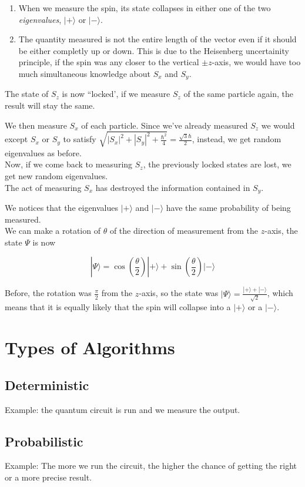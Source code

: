 \documentclass{article}
\begin{document}
\begin{enumerate}
    \item When we measure the spin, its state collapses in either one of the two \textit{eigenvalues}, \(|+\rangle\) or \(|-\rangle\).
    \item The quantity measured is not the entire length of the vector even if it should be either completly up or down.
        This is due to the Heisenberg uncertainity principle, if the spin was any closer to the vertical \(\pm z\)-axis,
        we would have too much simultaneous knowledge about \(S_x\) and \(S_y\).
\end{enumerate}

The state of \(S_z\) is now ``locked', if we measure \(S_z\) of the same particle again, the result will stay the same.

We then measure \(S_x\) of each particle. Since we've already measured \(S_z\) we would except \(S_x\) or \(S_y\)
to satisfy \(\sqrt{{|S_x|}^2 + {|S_y|}^2 + \frac{\hbar^2}{4}} = \frac{\sqrt{3}\hbar}{2}\), instead, we get random eigenvalues as before. \\
Now, if we come back to measuring \(S_z\), the previously locked states are lost, we get new random eigenvalues. \\
The act of measuring \(S_x\) has destroyed the information contained in \(S_y\).

We notices that the eigenvalues \(|+\rangle\) and \(|-\rangle\) have the same probability of being measured. \\
We can make a rotation of \(\theta\) of the direction of measurement from the \(z\)-axis, the state \(\Psi\) is now

\[
    |\Psi\rangle = \cos\left(\frac{\theta}{2}\right) |+\rangle + \sin\left(\frac{\theta}{2}\right)|-\rangle
\]

Before, the rotation was \(\frac{\pi}{2}\) from the \(z\)-axis, so the state was \(|\Psi\rangle=\frac{|+\rangle + |-\rangle}{\sqrt{2}}\),
which means that it is equally likely that the spin will collapse into a \(|+\rangle\) or a \(|-\rangle\).

\pagebreak

\section{Types of Algorithms}

\subsection{Deterministic}

Example: the quantum circuit is run and we measure the output.

\subsection{Probabilistic}

Example: The more we run the circuit, the higher the chance of getting the right or a more precise result.

\end{document}
